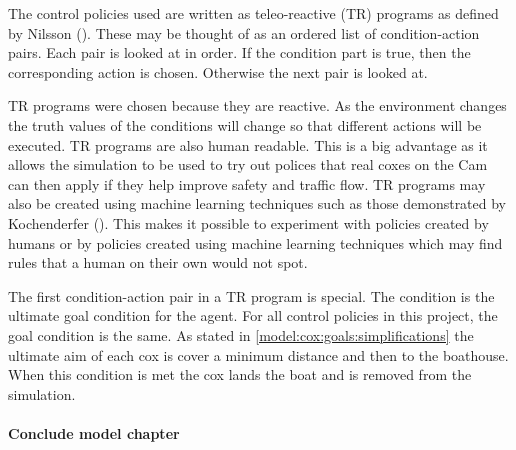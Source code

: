      The control policies used are written as teleo-reactive (TR) programs as defined by Nilsson (\cite{Nilsson1994}). These may be thought of as an ordered list of condition-action pairs. Each pair is looked at in order. If the condition part is true, then the corresponding action is chosen. Otherwise the next pair is looked at.
      
      TR programs were chosen because they are reactive. As the environment changes the truth values of the conditions will change so that different actions will be executed. TR programs are also human readable. This is a big advantage as it allows the simulation to be used to try out polices that real coxes on the Cam can then apply if they help improve safety and traffic flow. TR programs may also be created using machine learning techniques such as those demonstrated by Kochenderfer (\cite{Kochenderfer2003}). This makes it possible to experiment with policies created by humans or by policies created using machine learning techniques which may find rules that a human on their own would not spot.
      
      The first condition-action pair in a TR program is special. The condition is the ultimate goal condition for the agent. For all control policies in this project, the goal condition is the same. As stated in \ref{model:cox:goals:simplifications} the ultimate aim of each cox is cover a minimum distance and then to the boathouse. When this condition is met the cox lands the boat and is removed from the simulation.

\paragraph{Conclude model chapter}
